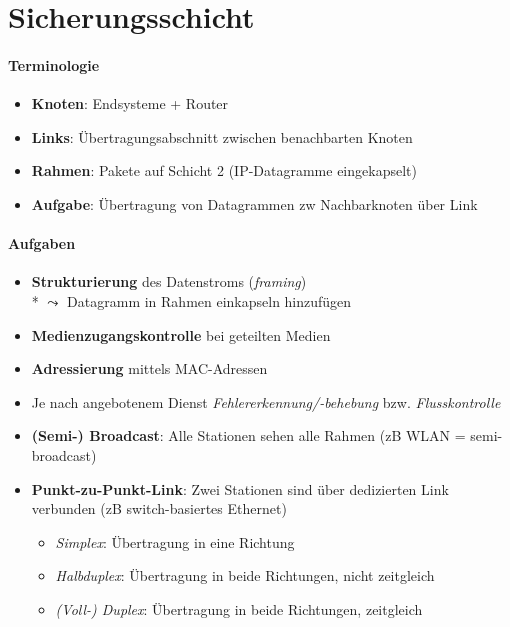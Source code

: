 \section{Sicherungsschicht}

\paragraph{Terminologie}
\begin{itemize}
  \item \textbf{Knoten}: Endsysteme + Router
  \item \textbf{Links}: Übertragungsabschnitt zwischen benachbarten Knoten
  \item \textbf{Rahmen}: Pakete auf Schicht 2 (IP-Datagramme eingekapselt)
  \item \textbf{Aufgabe}: Übertragung von Datagrammen zw Nachbarknoten über Link
\end{itemize}

\paragraph{Aufgaben}
\begin{itemize}
  \item \textbf{Strukturierung} des Datenstroms (\emph{framing}) \\* \( \leadsto \) Datagramm in Rahmen einkapseln hinzufügen
  \item \textbf{Medienzugangskontrolle} bei geteilten Medien
  \item \textbf{Adressierung} mittels MAC-Adressen
  \item Je nach angebotenem Dienst \emph{Fehlererkennung/-behebung} bzw. \emph{Flusskontrolle}
  \item \textbf{(Semi-) Broadcast}: Alle Stationen sehen alle Rahmen (zB WLAN = semi-broadcast)
  \item \textbf{Punkt-zu-Punkt-Link}: Zwei Stationen sind über dedizierten Link verbunden (zB switch-basiertes Ethernet)
  \begin{itemize}
    \item \emph{Simplex}: Übertragung in eine Richtung
    \item \emph{Halbduplex}: Übertragung in beide Richtungen, nicht zeitgleich
    \item \emph{(Voll-) Duplex}: Übertragung in beide Richtungen, zeitgleich
  \end{itemize}
\end{itemize}

